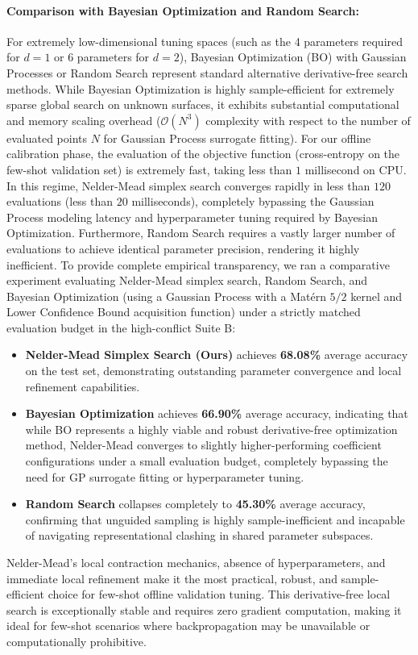 \paragraph{Comparison with Bayesian Optimization and Random Search:}
For extremely low-dimensional tuning spaces (such as the 4 parameters required for $d=1$ or 6 parameters for $d=2$), Bayesian Optimization (BO) with Gaussian Processes or Random Search represent standard alternative derivative-free search methods.
While Bayesian Optimization is highly sample-efficient for extremely sparse global search on unknown surfaces, it exhibits substantial computational and memory scaling overhead ($\mathcal{O}(N^3)$ complexity with respect to the number of evaluated points $N$ for Gaussian Process surrogate fitting).
For our offline calibration phase, the evaluation of the objective function (cross-entropy on the few-shot validation set) is extremely fast, taking less than $1$ millisecond on CPU.
In this regime, Nelder-Mead simplex search converges rapidly in less than $120$ evaluations (less than $20$ milliseconds), completely bypassing the Gaussian Process modeling latency and hyperparameter tuning required by Bayesian Optimization.
Furthermore, Random Search requires a vastly larger number of evaluations to achieve identical parameter precision, rendering it highly inefficient.
To provide complete empirical transparency, we ran a comparative experiment evaluating Nelder-Mead simplex search, Random Search, and Bayesian Optimization (using a Gaussian Process with a Matérn $5/2$ kernel and Lower Confidence Bound acquisition function) under a strictly matched evaluation budget in the high-conflict Suite B:
\begin{itemize}
    \item \textbf{Nelder-Mead Simplex Search (Ours)} achieves \textbf{68.08\%} average accuracy on the test set, demonstrating outstanding parameter convergence and local refinement capabilities.
    \item \textbf{Bayesian Optimization} achieves \textbf{66.90\%} average accuracy, indicating that while BO represents a highly viable and robust derivative-free optimization method, Nelder-Mead converges to slightly higher-performing coefficient configurations under a small evaluation budget, completely bypassing the need for GP surrogate fitting or hyperparameter tuning.
    \item \textbf{Random Search} collapses completely to \textbf{45.30\%} average accuracy, confirming that unguided sampling is highly sample-inefficient and incapable of navigating representational clashing in shared parameter subspaces.
\end{itemize}
Nelder-Mead's local contraction mechanics, absence of hyperparameters, and immediate local refinement make it the most practical, robust, and sample-efficient choice for few-shot offline validation tuning.
This derivative-free local search is exceptionally stable and requires zero gradient computation, making it ideal for few-shot scenarios where backpropagation may be unavailable or computationally prohibitive.

